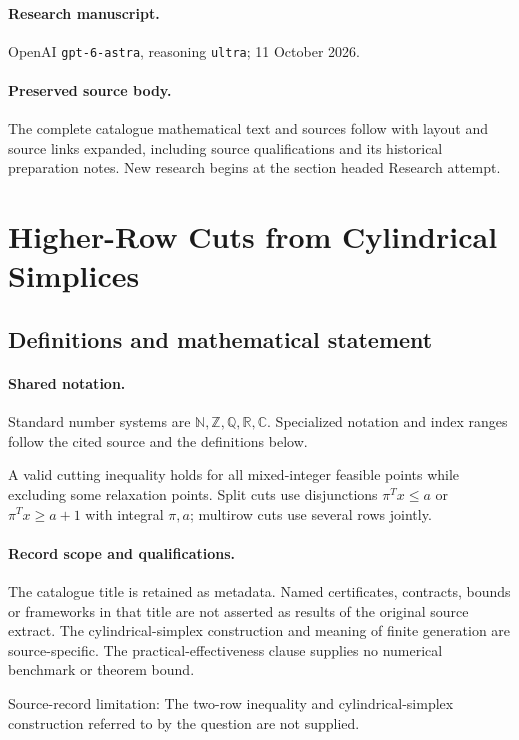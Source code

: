 \documentclass[11pt]{article}
\begin{document}
\paragraph{Research manuscript.} OpenAI \texttt{gpt-6-astra}, reasoning \texttt{ultra}; 11 October 2026.
\paragraph{Preserved source body.} The complete catalogue mathematical text and sources follow with layout and source links expanded, including source qualifications and its historical preparation notes. New research begins at the section headed Research attempt.

\section{Higher-Row Cuts from Cylindrical Simplices}\label{statement}

\subsection{Definitions and mathematical statement}

\paragraph{Shared notation.}Standard number systems are $\mathbb N,\mathbb Z,\mathbb Q,\mathbb R,\mathbb C$. Specialized notation and index ranges follow the cited source and the definitions below.


A valid cutting inequality holds for all mixed-integer feasible points while excluding some relaxation points. Split cuts use disjunctions $\pi^Tx\leq a$ or $\pi^Tx\geq a+1$ with integral $\pi,a$; multirow cuts use several rows jointly.
\paragraph{Record scope and qualifications.}
The catalogue title is retained as metadata. Named certificates, contracts, bounds or frameworks in that title are not asserted as results of the original source extract.
The cylindrical-simplex construction and meaning of finite generation are source-specific. The practical-effectiveness clause supplies no numerical benchmark or theorem bound.

Source-record limitation: The two-row inequality and cylindrical-simplex construction referred to by the question are not supplied.
\end{document}
